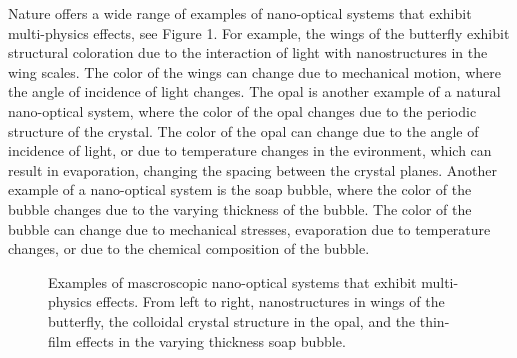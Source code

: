 Nature offers a wide range of examples of nano-optical systems that exhibit 
multi-physics effects, see Figure 1.
For example, the wings of the butterfly exhibit structural coloration due to the
 interaction of light 
with nanostructures in the wing scales. The color of the wings can change due to
 mechanical motion, where the angle of incidence of light changes.
The opal is another example of a natural nano-optical system, where the color of the opal
changes due to the periodic structure of the crystal. The color of the opal can change
due to the angle of incidence of light, or due to temperature changes in the evironment, 
which can result in evaporation, changing the spacing between the crystal planes.
Another example of a nano-optical system is the soap bubble, where the color of the bubble
changes due to the varying thickness of the bubble. The color of the bubble can change due to
mechanical stresses, evaporation due to temperature changes, or due to the chemical composition
of the bubble.

\begin{figure}[tb]
    \centering
    \caption{Examples of mascroscopic nano-optical systems that exhibit multi-physics effects. From left to right, nanostructures in wings of the butterfly, the colloidal crystal structure in the opal, and the thin-film effects in the varying thickness soap bubble.}
    \label{fig:motivation_natural}
\end{figure}

